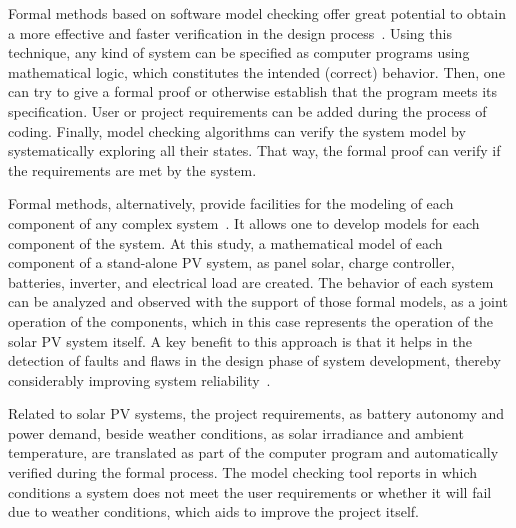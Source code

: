 \documentclass[journal]{IEEEtran}
\begin{document}
Formal methods based on software model checking offer great potential to obtain a more effective and faster verification in the design process~\cite{Clarke2008}.  
 Using this technique, any kind of system can be specified as computer programs using mathematical logic, which constitutes the intended (correct) behavior. Then, one can try to give a formal proof or otherwise establish that the program meets its specification. User or project requirements can be added during the process of coding. %
%
%
Finally, model checking algorithms can verify the system model by systematically exploring all their states. That way, the formal proof can verify if the requirements are met by the system.

Formal methods, alternatively, provide facilities for the modeling of each component of any complex system~\cite{Hall1990}. It allows one to develop models for each component of the system. At this study, a mathematical model of each component of a stand-alone PV system, as panel solar, charge controller, batteries, inverter, and electrical load are created. The behavior of each system can be analyzed and observed with the support of those formal models, as a joint operation of the components, which in this case represents the operation of the solar PV system itself. A key benefit to this approach is that it helps in the detection of faults and flaws in the design phase of system development, thereby considerably improving system reliability~\cite{Akram2018}.

Related to solar PV systems, the project requirements, as battery autonomy and power demand, beside weather conditions, as solar irradiance and ambient temperature, are translated as part of the computer program and automatically verified during the formal process. The model checking tool reports in which conditions a system does not meet the user requirements or whether it will fail due to weather conditions, which aids to improve the project itself.  
\end{document}
